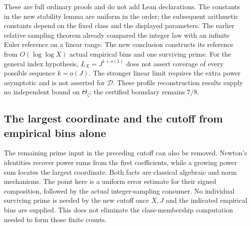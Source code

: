 \documentclass[11pt]{article}
\theoremstyle{definition}
\begin{document}
These are full ordinary proofs and do not add Lean declarations.
The constants in the new stability lemma are uniform in the order;
the subsequent arithmetic constants depend on the fixed class
and the displayed parameters.
The earlier relative sampling theorem already compared the
integer law with an infinite Euler reference on a linear range.
The new conclusion constructs its reference from
$O(\log\log X)$ actual empirical bins and one surviving prime.
For the general index hypothesis, $L_X=J^{1+o(1)}$ does not
assert coverage of every possible sequence $k=o(J)$.
The stronger linear limit requires the extra power asymptotic
and is not asserted for $\mathcal D$.
These profile reconstruction results supply no independent
bound on $\Theta_\zeta$; the certified boundary remains $7/8$.

\subsection{The largest coordinate and the cutoff from empirical bins alone}
\label{sec:empirical-moment-cutoff}

The remaining prime input in the preceding cutoff can also be
removed.  Newton's identities recover power sums from the first
coefficients, while a growing power sum locates the largest
coordinate.  Both facts are classical algebraic and norm
mechanisms.  The point here is a uniform error estimate for
their signed composition, followed by the actual integer-sampling
consumer.  No individual surviving prime is needed by the new
cutoff once $X,J$ and the indicated empirical bins are supplied.
This does not eliminate the class-membership computation needed
to form those finite counts.
\end{document}

